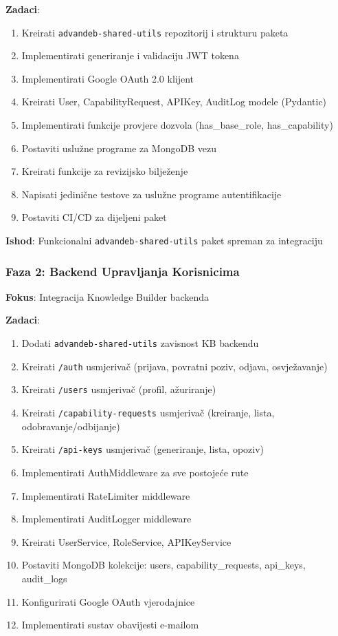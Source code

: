 \documentclass[12pt,a4paper]{article}
\begin{document}
\textbf{Zadaci}:
\begin{enumerate}
    \item Kreirati \texttt{advandeb-shared-utils} repozitorij i strukturu paketa
    \item Implementirati generiranje i validaciju JWT tokena
    \item Implementirati Google OAuth 2.0 klijent
    \item Kreirati User, CapabilityRequest, APIKey, AuditLog modele (Pydantic)
    \item Implementirati funkcije provjere dozvola (has\_base\_role, has\_capability)
    \item Postaviti uslužne programe za MongoDB vezu
    \item Kreirati funkcije za revizijsko bilježenje
    \item Napisati jedinične testove za uslužne programe autentifikacije
    \item Postaviti CI/CD za dijeljeni paket
\end{enumerate}

\textbf{Ishod}: Funkcionalni \texttt{advandeb-shared-utils} paket spreman za integraciju

\subsubsection{Faza 2: Backend Upravljanja Korisnicima}
\textbf{Fokus}: Integracija Knowledge Builder backenda

\textbf{Zadaci}:
\begin{enumerate}
    \item Dodati \texttt{advandeb-shared-utils} zavisnost KB backendu
    \item Kreirati \texttt{/auth} usmjerivač (prijava, povratni poziv, odjava, osvježavanje)
    \item Kreirati \texttt{/users} usmjerivač (profil, ažuriranje)
    \item Kreirati \texttt{/capability-requests} usmjerivač (kreiranje, lista, odobravanje/odbijanje)
    \item Kreirati \texttt{/api-keys} usmjerivač (generiranje, lista, opoziv)
    \item Implementirati AuthMiddleware za sve postojeće rute
    \item Implementirati RateLimiter middleware
    \item Implementirati AuditLogger middleware
    \item Kreirati UserService, RoleService, APIKeyService
    \item Postaviti MongoDB kolekcije: users, capability\_requests, api\_keys, audit\_logs
    \item Konfigurirati Google OAuth vjerodajnice
    \item Implementirati sustav obavijesti e-mailom
\end{enumerate}
\end{document}
